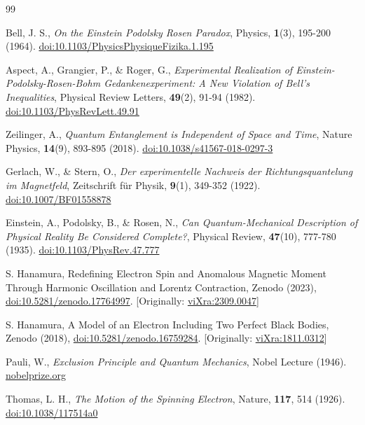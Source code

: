 \documentclass[%
 reprint,
 amsmath,amssymb,
 aps,
]{revtex4-1}
\numberwithin{equation}{section}%
\begin{document}
\begin{thebibliography}{99}

Bell, J. S.,
\textit{On the Einstein Podolsky Rosen Paradox},
Physics,
\textbf{1}(3), 195-200 (1964).
\href{https://doi.org/10.1103/PhysicsPhysiqueFizika.1.195}{doi:10.1103/PhysicsPhysiqueFizika.1.195}

Aspect, A., Grangier, P., \& Roger, G.,
\textit{Experimental Realization of Einstein-Podolsky-Rosen-Bohm Gedankenexperiment: A New Violation of Bell's Inequalities},
Physical Review Letters,
\textbf{49}(2), 91-94 (1982).
\href{https://doi.org/10.1103/PhysRevLett.49.91}{doi:10.1103/PhysRevLett.49.91}

Zeilinger, A.,
\textit{Quantum Entanglement is Independent of Space and Time},
Nature Physics,
\textbf{14}(9), 893-895 (2018).
\href{https://doi.org/10.1038/s41567-018-0297-3}{doi:10.1038/s41567-018-0297-3}

Gerlach, W., \& Stern, O.,
\textit{Der experimentelle Nachweis der Richtungsquantelung im Magnetfeld},
Zeitschrift für Physik,
\textbf{9}(1), 349-352 (1922).
\href{https://doi.org/10.1007/BF01558878}{doi:10.1007/BF01558878}

Einstein, A., Podolsky, B., \& Rosen, N.,
\textit{Can Quantum-Mechanical Description of Physical Reality Be Considered Complete?},
Physical Review,
\textbf{47}(10), 777-780 (1935).
\href{https://doi.org/10.1103/PhysRev.47.777}{doi:10.1103/PhysRev.47.777}

S. Hanamura, Redefining Electron Spin and Anomalous Magnetic Moment Through Harmonic Oscillation and Lorentz Contraction, Zenodo (2023), \href{https://doi.org/10.5281/zenodo.17764997}{doi:10.5281/zenodo.17764997}. [Originally: \href{https://vixra.org/abs/2309.0047}{viXra:2309.0047}]

S. Hanamura, A Model of an Electron Including Two Perfect Black Bodies, Zenodo (2018), \href{https://doi.org/10.5281/zenodo.16759284}{doi:10.5281/zenodo.16759284}. [Originally: \href{http://vixra.org/abs/1811.0312}{viXra:1811.0312}]

Pauli, W.,
\textit{Exclusion Principle and Quantum Mechanics},
Nobel Lecture (1946).
\href{https://www.nobelprize.org/prizes/physics/1945/pauli/lecture/}{nobelprize.org}

Thomas, L. H.,
\textit{The Motion of the Spinning Electron},
Nature,
\textbf{117}, 514 (1926).
\href{https://doi.org/10.1038/117514a0}{doi:10.1038/117514a0}


\end{thebibliography}
\end{document}

